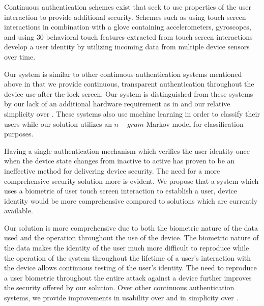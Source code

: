 %
Continuous authentication schemes exist
that seek to use 
properties of the user interaction
to provide additional security.
%
Schemes such as 
\cite{feng2012continuous}
using touch screen interactions in combination with a glove containing accelerometers, gyroscopes,
and
\cite{frank2013touchalytics}
using $30$ behavioral touch features extracted from touch screen interactions
%
develop a user identity
by utilizing incoming data from multiple device sensors over time.

Our system is similar to other continuous authentication
systems mentioned above
in that we provide continuous, transparent authentication 
throughout the device use 
after the lock screen.
%
Our system is distinguished from these systems
by our lack of an additional hardware requirement as in \cite{feng2012continuous}
and our relative simplicity over \cite{frank2013touchalytics}.
These systems also use machine learning in order to classify their users
while
our solution utilizes 
an $n-gram$ Markov model for classification purposes.
%

Having a single authentication mechanism which
verifies the user identity once when the device
state changes from inactive to active has
proven to be an ineffective method for 
delivering device security.
%
The need for a more comprehensive security solution more is evident.
%
We propose that a system which uses
a biometric of user touch screen interaction to
establish a user, device identity would 
be more comprehensive compared to solutions 
which are currently available.

Our solution is more comprehensive due to
both 
the biometric nature of the data used and
the operation throughout the use of the device.
%
The biometric nature of the data makes the
identity of the user much more difficult to reproduce while
%
the operation of the system throughout the lifetime of 
a user's interaction with the device allows
continuous testing of the user's identity.
%
The need to reproduce a user biometric throughout the entire attack
against a device further improves the security offered by our solution.
%
Over other continuous authentication systems,
we provide improvements 
in usability over \cite{feng2012continuous}
and in simplicity over \cite{frank2013touchalytics}.
